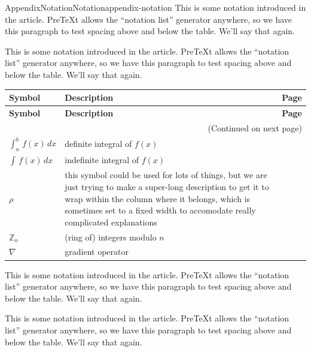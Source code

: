 \documentclass[twoside,10pt,]{article}
\numberwithin{equation}{section}
\begin{document}
\begin{appendixptx}{Appendix}{Notation}{}{Notation}{}{}{appendix-notation}
\renewcommand*{\appendixname}{Appendix}
This is some notation introduced in the article.  PreTeXt allows the ``notation list'' generator anywhere, so we have this paragraph to test spacing above and below the table.  We'll say that again.%
\par
This is some notation introduced in the article.  PreTeXt allows the ``notation list'' generator anywhere, so we have this paragraph to test spacing above and below the table.  We'll say that again.%
\begin{longtable}[l]{lp{}r}
\addtocounter{table}{-1}
\textbf{Symbol}&\textbf{Description}&\textbf{Page}\\[1em]
\endfirsthead
\textbf{Symbol}&\textbf{Description}&\textbf{Page}\\[1em]
\endhead
\multicolumn{3}{r}{(Continued on next page)}\\
\endfoot
\endlastfoot
\(\int_a^b\,f(x)\,dx\)&definite integral of \(f(x)\)&\pageref{section-introduction-2-4}\\
\(\int\,f(x)\,dx\)&indefinite integral of \(f(x)\)&\pageref{definition-indefinite-integral-3}\\
\(\rho\)&this symbol could be used for lots of things, but we are just trying to make a super-long description to get it to wrap within the column where it belongs, which is sometimes set to a fixed width to accomodate really complicated explanations&\pageref{derivatives-9-2-3}\\
\(\mathbb{Z}_n\)&(ring of) integers modulo \(n\)&\pageref{derivatives-9-2-11}\\
\(\nabla\)&gradient operator&\pageref{section-mathematics-3-3-3}\\
\end{longtable}
This is some notation introduced in the article.  PreTeXt allows the ``notation list'' generator anywhere, so we have this paragraph to test spacing above and below the table.  We'll say that again.%
\par
This is some notation introduced in the article.  PreTeXt allows the ``notation list'' generator anywhere, so we have this paragraph to test spacing above and below the table.  We'll say that again.%
\end{appendixptx}
%
%
\typeout{************************************************}
\typeout{************************************************}
%
\end{document}
